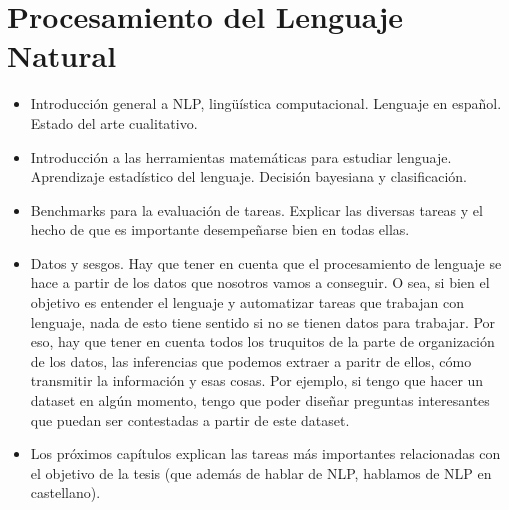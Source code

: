 \section{Procesamiento del Lenguaje Natural}




\begin{itemize}
    \item Introducción general a NLP, lingüística computacional. Lenguaje en español. Estado del arte cualitativo.
    \item Introducción a las herramientas matemáticas para estudiar lenguaje. Aprendizaje estadístico del lenguaje. Decisión bayesiana y clasificación.
    \item Benchmarks para la evaluación de tareas. Explicar las diversas tareas y el hecho de que es importante desempeñarse bien en todas ellas. 
    \item Datos y sesgos. Hay que tener en cuenta que el procesamiento de lenguaje se hace a partir de los datos que nosotros vamos a conseguir. O sea, si bien el objetivo es entender el lenguaje y automatizar tareas que trabajan con lenguaje, nada de esto tiene sentido si no se tienen datos para trabajar.
    Por eso, hay que tener en cuenta todos los truquitos de la parte de organización de los datos, las inferencias que podemos extraer a paritr de ellos, cómo transmitir la información y esas cosas. Por ejemplo, si tengo que hacer un dataset en algún momento, tengo que poder diseñar preguntas interesantes que puedan ser contestadas a partir de este dataset.
    \item Los próximos capítulos explican las tareas más importantes relacionadas con el objetivo de la tesis (que además de hablar de NLP, hablamos de NLP en castellano).
\end{itemize}

